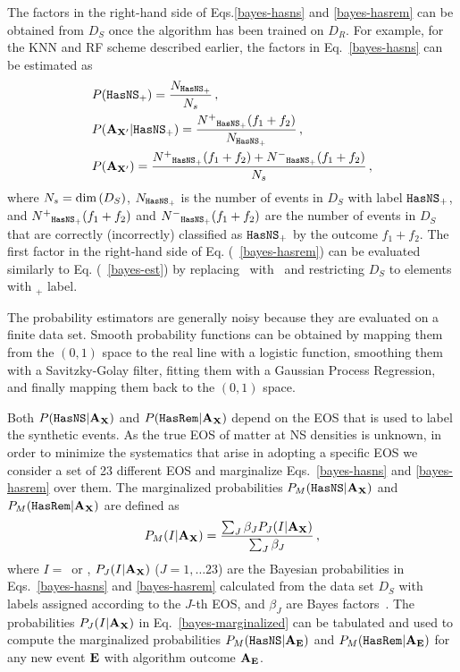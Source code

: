 The factors in the right-hand side of Eqs.\eqref{bayes-hasns} and \eqref{bayes-hasrem} can be obtained from $D_{S}$ once the algorithm has been trained on $D_{R}$. For example, for the \ac{KNN} and \ac{RF} scheme described earlier, the factors in Eq.~\eqref{bayes-hasns} can be estimated as  
%
\begin{equation}
\begin{aligned}
&P({{\tt HasNS}}_+)=\frac{N_{{{\tt HasNS}}_+}}{N_s}\,,\nonumber\\
&P({\bf A}_{{\bf X}'}|{{\tt HasNS}}_+)=\frac{N^+{}_{{{\tt HasNS}}_+}(f_1+f_2)}{N_{{{\tt HasNS}}_+}}\,,\nonumber\\
&P({\bf A}_{{\bf X}'})=\frac{N^+{}_{{{\tt HasNS}}_+}(f_1+f_2)+N^-{}_{{{\tt HasNS}}_+}(f_1+f_2)}{N_s}\,,
\label{bayes-est}
\end{aligned}
\end{equation}
%
where $N_s=\hbox{dim}\,(D_S)$, $N_{{{\tt HasNS}}_+}$ is the number of events in $D_S$ with label 
${{\tt HasNS}}_+$, and $N^+{}_{{{\tt HasNS}}_+}(f_1+f_2)$ and $N^-{}_{{{\tt HasNS}}_+}(f_1+f_2)$ are the number of events in $D_S$ that are correctly (incorrectly) classified as ${{{\tt HasNS}}_+}$ by the outcome $f_1+f_2$. The first factor in the right-hand side of Eq. (~\ref{bayes-hasrem}) can be evaluated similarly to Eq. (~\ref{bayes-est}) by replacing \hasns\ with \hasrem\ and restricting $D_S$ to elements with \hasns$_+$ label.

The probability estimators are generally noisy because they are evaluated on a finite data set. Smooth probability functions can be obtained by mapping them from the $(0,1)$ space to the real
line with a logistic function, smoothing them with a Savitzky-Golay filter, fitting them with a Gaussian Process Regression, and finally mapping them back to the $(0,1)$ space.   

Both $P({{\tt HasNS}}|{\bf A}_{\bf X})$ and $P({{\tt HasRem}}|{\bf A}_{\bf X})$ depend on the \ac{EOS} that is used to label the synthetic events. As the true \ac{EOS} of matter at \ac{NS} densities is unknown, in order to minimize the systematics that arise in adopting a specific \ac{EOS} we consider a set of 23 different \ac{EOS} and marginalize Eqs.~\eqref{bayes-hasns} and \eqref{bayes-hasrem} over them. The marginalized probabilities $P_M({{\tt HasNS}}|{\bf A}_{\bf X})$ and $P_M({{\tt HasRem}}|{\bf A}_{\bf X})$ are defined as
%
\begin{equation}
\begin{aligned}
P_M(I|{\bf A}_{\bf X})=\frac{\sum_J\beta_J P_J(I|{\bf A}_{\bf X})}{\sum_J\beta_J}\,,
\label{bayes-marginalized}
\end{aligned}
\end{equation}
%
where $I=$\hasns\ or \hasrem, $P_J(I|{\bf A}_{\bf X})$ ($J=1,\dots 23$) are the Bayesian probabilities in Eqs.~\eqref{bayes-hasns} and \eqref{bayes-hasrem} calculated from the data set $D_S$ with labels assigned according to the $J$-th \ac{EOS}, and $\beta_J$ are Bayes factors~\cite{Ghosh:2021eqv}. The probabilities $P_J(I|{\bf A}_{\bf X})$ in Eq.~\eqref{bayes-marginalized} can be tabulated and used to compute the marginalized probabilities $P_M({{\tt HasNS}}|{\bf A}_{\bf E})$ and $P_M({{\tt HasRem}}|{\bf A}_{\bf E})$ for any new event $\bf E$ with algorithm outcome $\bf A_{E}$.
